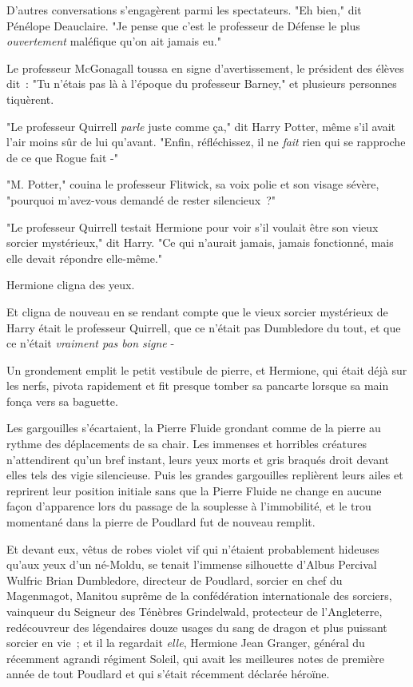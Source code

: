 D'autres conversations s'engagèrent parmi les spectateurs. "Eh bien," dit Pénélope Deauclaire. "Je pense que c'est le professeur de Défense le plus \emph{ouvertement} maléfique qu'on ait jamais eu."

Le professeur McGonagall toussa en signe d'avertissement, le président des élèves dit~: "Tu n'étais pas là à l'époque du professeur Barney," et plusieurs personnes tiquèrent.

"Le professeur Quirrell \emph{parle} juste comme ça," dit Harry Potter, même s'il avait l'air moins sûr de lui qu'avant. "Enfin, réfléchissez, il ne \emph{fait} rien qui se rapproche de ce que Rogue fait -"

"M. Potter," couina le professeur Flitwick, sa voix polie et son visage sévère, "pourquoi m'avez-vous demandé de rester silencieux~?"

"Le professeur Quirrell testait Hermione pour voir s'il voulait être son vieux sorcier mystérieux," dit Harry. "Ce qui n'aurait jamais, jamais fonctionné, mais elle devait répondre elle-même."

Hermione cligna des yeux.

Et cligna de nouveau en se rendant compte que le vieux sorcier mystérieux de Harry était le professeur Quirrell, que ce n'était pas Dumbledore du tout, et que ce n'était \emph{vraiment pas bon signe} -

Un grondement emplit le petit vestibule de pierre, et Hermione, qui était déjà sur les nerfs, pivota rapidement et fit presque tomber sa pancarte lorsque sa main fonça vers sa baguette.

Les gargouilles s'écartaient, la Pierre Fluide grondant comme de la pierre au rythme des déplacements de sa chair. Les immenses et horribles créatures n'attendirent qu'un bref instant, leurs yeux morts et gris braqués droit devant elles tels des vigie silencieuse. Puis les grandes gargouilles replièrent leurs ailes et reprirent leur position initiale sans que la Pierre Fluide ne change en aucune façon d'apparence lors du passage de la souplesse à l'immobilité, et le trou momentané dans la pierre de Poudlard fut de nouveau remplit.

Et devant eux, vêtus de robes violet vif qui n'étaient probablement hideuses qu'aux yeux d'un né-Moldu, se tenait l'immense silhouette d'Albus Percival Wulfric Brian Dumbledore, directeur de Poudlard, sorcier en chef du Magenmagot, Manitou suprême de la confédération internationale des sorciers, vainqueur du Seigneur des Ténèbres Grindelwald, protecteur de l'Angleterre, redécouvreur des légendaires douze usages du sang de dragon et plus puissant sorcier en vie~; et il la regardait \emph{elle}, Hermione Jean Granger, général du récemment agrandi régiment Soleil, qui avait les meilleures notes de première année de tout Poudlard et qui s'était récemment déclarée héroïne.

